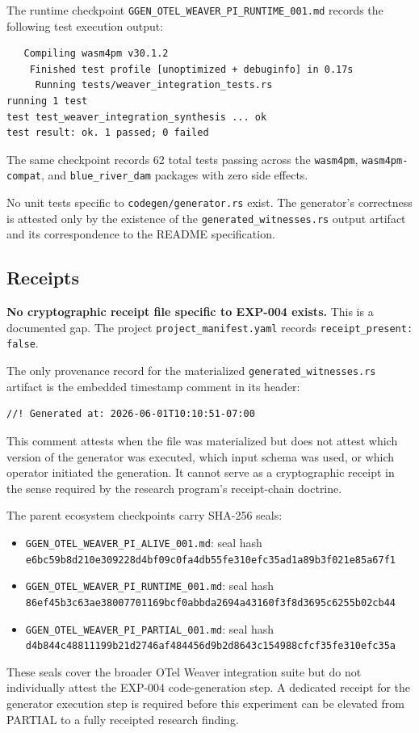 The runtime checkpoint \texttt{GGEN\_OTEL\_WEAVER\_PI\_RUNTIME\_001.md} records the
following test execution output:
\begin{verbatim}
   Compiling wasm4pm v30.1.2
    Finished test profile [unoptimized + debuginfo] in 0.17s
     Running tests/weaver_integration_tests.rs
running 1 test
test test_weaver_integration_synthesis ... ok
test result: ok. 1 passed; 0 failed
\end{verbatim}
The same checkpoint records 62 total tests passing across the \texttt{wasm4pm},
\texttt{wasm4pm-compat}, and \texttt{blue\_river\_dam} packages with zero side effects.

No unit tests specific to \texttt{codegen/generator.rs} exist. The generator's correctness
is attested only by the existence of the \texttt{generated\_witnesses.rs} output artifact
and its correspondence to the README specification.

\subsection{Receipts}
\label{sec:otel-weaver-exp-004-registry-to-witness-receipts-section}

\textbf{No cryptographic receipt file specific to EXP-004 exists.} This is a documented
gap. The project \texttt{project\_manifest.yaml} records \texttt{receipt\_present: false}.

The only provenance record for the materialized \texttt{generated\_witnesses.rs} artifact
is the embedded timestamp comment in its header:
\begin{verbatim}
//! Generated at: 2026-06-01T10:10:51-07:00
\end{verbatim}
This comment attests when the file was materialized but does not attest which version of
the generator was executed, which input schema was used, or which operator initiated the
generation. It cannot serve as a cryptographic receipt in the sense required by the
research program's receipt-chain doctrine.

The parent ecosystem checkpoints carry SHA-256 seals:
\begin{itemize}
  \item \texttt{GGEN\_OTEL\_WEAVER\_PI\_ALIVE\_001.md}: seal hash
    \texttt{e6bc59b8d210e309228d4bf09c0fa4db55fe310efc35ad1a89b3f021e85a67f1}
  \item \texttt{GGEN\_OTEL\_WEAVER\_PI\_RUNTIME\_001.md}: seal hash
    \texttt{86ef45b3c63ae38007701169bcf0abbda2694a43160f3f8d3695c6255b02cb44}
  \item \texttt{GGEN\_OTEL\_WEAVER\_PI\_PARTIAL\_001.md}: seal hash
    \texttt{d4b844c48811199b21d2746af484456d9b2d8643c154988cfcf35fe310efc35a}
\end{itemize}
These seals cover the broader OTel Weaver integration suite but do not individually attest
the EXP-004 code-generation step. A dedicated receipt for the generator execution step
is required before this experiment can be elevated from PARTIAL to a fully receipted
research finding.

